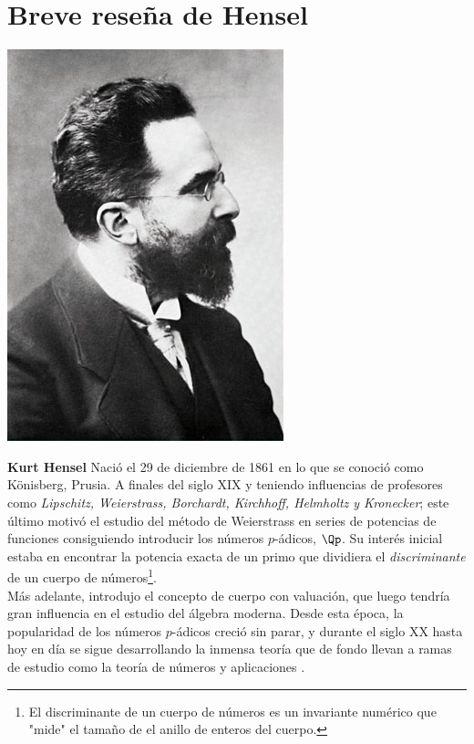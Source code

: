 \section*{Breve reseña de Hensel}
\begin{center}
	\includegraphics[scale = 0.76]{img/kurt_hensel.jpg}
\end{center}
	
	\textbf{Kurt Hensel} Nació el 29 de diciembre de 1861 en lo que se conoció como Könisberg, Prusia. A finales del siglo XIX y teniendo influencias de profesores como \textit{ Lipschitz, Weierstrass, Borchardt, Kirchhoff, Helmholtz y Kronecker}; este último motivó el estudio del método de Weierstrass en series de potencias de funciones consiguiendo introducir los números $p$-ádicos, $\Qp$. Su interés inicial estaba en encontrar la potencia exacta de un primo que dividiera el \textit{discriminante} de un cuerpo de números\footnote{El discriminante de un cuerpo de números es un invariante numérico que "mide" el tamaño de el anillo de enteros del cuerpo.}.\\
	
	Más adelante, introdujo el concepto de cuerpo con valuación, que luego tendría gran influencia en el estudio del álgebra moderna. Desde esta época, la popularidad de los números $p$-ádicos creció sin parar, y durante el siglo XX hasta hoy en día se sigue desarrollando la inmensa teoría que de fondo llevan a ramas de estudio como la teoría de números y aplicaciones \cite{Av-1}. 
	
